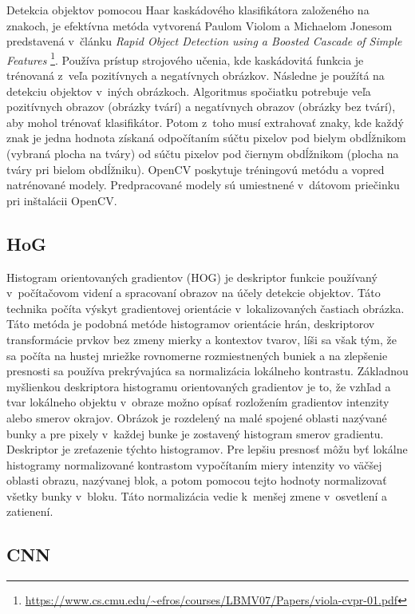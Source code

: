 \documentclass[]{article}
\begin{document}
	Detekcia objektov pomocou Haar kaskádového klasifikátora založeného na znakoch, je efektívna metóda vytvorená Paulom Violom a Michaelom Jonesom predstavená v~článku \textit{Rapid Object Detection using a Boosted Cascade of Simple Features} \footnote{\url{https://www.cs.cmu.edu/~efros/courses/LBMV07/Papers/viola-cvpr-01.pdf}}. Používa prístup strojového učenia, kde kaskádovitá funkcia je trénovaná z~veľa pozitívnych a negatívnych obrázkov. Následne je použítá na detekciu objektov v~iných obrázkoch. Algoritmus spočiatku potrebuje veľa pozitívnych obrazov (obrázky tvárí) a negatívnych obrazov (obrázky bez tvárí), aby mohol trénovať klasifikátor. Potom z~toho musí extrahovať znaky, kde každý znak je jedna hodnota získaná odpočítaním súčtu pixelov pod bielym obdĺžnikom (vybraná plocha na tváry) od súčtu pixelov pod čiernym obdĺžnikom (plocha na tváry pri bielom obdĺžniku). OpenCV poskytuje tréningovú metódu a vopred natrénované modely. Predpracované modely sú umiestnené v~dátovom priečinku pri inštalácii OpenCV.
	
	\subsection*{HoG}
	
	Histogram orientovaných gradientov (HOG) je deskriptor funkcie používaný v~počítačovom videní a spracovaní obrazov na účely detekcie objektov. Táto technika počíta výskyt gradientovej orientácie v~lokalizovaných častiach obrázka. Táto metóda je podobná metóde histogramov orientácie hrán, deskriptorov transformácie prvkov bez zmeny mierky a kontextov tvarov, líši sa však tým, že sa počíta na hustej mriežke rovnomerne rozmiestnených buniek a na zlepšenie presnosti sa používa prekrývajúca sa normalizácia lokálneho kontrastu. Základnou myšlienkou deskriptora histogramu orientovaných gradientov je to, že vzhľad a tvar lokálneho objektu v~obraze možno opísať rozložením gradientov intenzity alebo smerov okrajov. Obrázok je rozdelený na malé spojené oblasti nazývané bunky a pre pixely v~každej bunke je zostavený histogram smerov gradientu. Deskriptor je zreťazenie týchto histogramov. Pre lepšiu presnosť môžu byť lokálne histogramy normalizované kontrastom vypočítaním miery intenzity vo väčšej oblasti obrazu, nazývanej blok, a potom pomocou tejto hodnoty normalizovať všetky bunky v~bloku. Táto normalizácia vedie k~menšej zmene v~osvetlení a zatienení.
	
	\subsection*{CNN}
	
\end{document}
